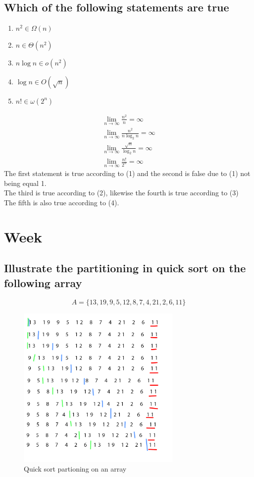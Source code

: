 \documentclass[12pt, a4paper]{article}
\begin{document}
			\subsection{Which of the following statements are true}
				\begin{enumerate}
					\item $n^2\in \Omega(n)$
					\item $n\in \Theta(n^2)$
					\item $n\log n\in o(n^2)$
					\item $\log n \in O(\sqrt{n})$
					\item $n! \in \omega (2^n)$
				\end{enumerate}
				\begin{align}
					\lim\limits_{n\rightarrow \infty}\frac{n^2}{n}=\infty\\
					\lim\limits_{n\rightarrow \infty}\frac{n^2}{n\log_2n}=\infty\\
					\lim\limits_{n\rightarrow \infty}\frac{\sqrt{n}}{\log_2n}=\infty\\
					\lim\limits_{n\rightarrow \infty}\frac{n!}{2^n}=\infty
				\end{align}
				The first statement is true according to (1) and the second is false due to (1) not being equal 1.\\
				The third is true according to (2), likewise the fourth is true according to (3)\\
				The fifth is also true according to (4).
		\section{Week}
			\subsection{Illustrate the partitioning in quick sort on the following array}
				$$A=\{13,19,9,5,12,8,7,4,21,2,6,11\}$$
				\begin{figure}[h!]
					\center
					\includegraphics[width=300px]{assets/week8Exercise1.png}
					\caption{Quick sort partioning on an array}
				\end{figure}
\end{document}
